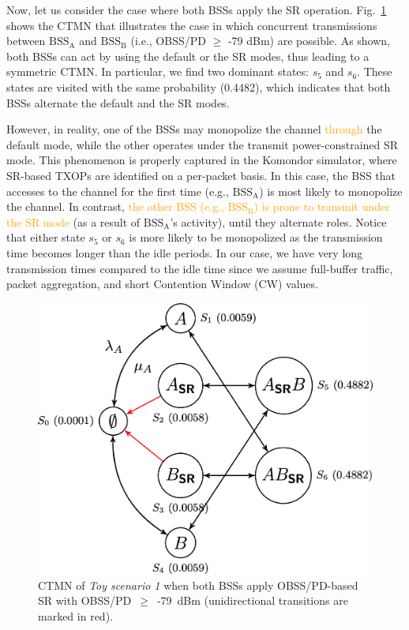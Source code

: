 \documentclass{ieeeaccess}
\begin{document}
Now, let us consider the case where both BSSs apply the SR operation. Fig.~\ref{fig:ctmn_toy_scenario_1c} shows the CTMN that illustrates the case in which concurrent transmissions between $\text{BSS}_\text{A}$ and $\text{BSS}_\text{B}$ (i.e., OBSS/PD $\geq$ -79 dBm) are possible. As shown, both BSSs can act by using the default or the SR modes, thus leading to a symmetric CTMN. In particular, we find two dominant states: $s_5$  and $s_6$. These states are visited with the same probability (0.4482), which indicates that both BSSs alternate the default and the SR modes. 

However, in reality, one of the BSSs may monopolize the channel \textcolor{orange}{through} the default mode, while the other operates under the transmit power-constrained SR mode. This phenomenon is properly captured in the Komondor simulator, where SR-based TXOPs are identified on a per-packet basis. In this case, the BSS that accesses to the channel for the first time (e.g., $\text{BSS}_\text{A}$) is most likely to monopolize the channel. In contrast, \textcolor{orange}{the other BSS (e.g., $\text{BSS}_\text{B}$) is prone to transmit under the SR mode} (as a result of $\text{BSS}_\text{A}$'s activity), until they alternate roles. Notice that either state $s_5$  or $s_6$ is more likely to be monopolized as the transmission time becomes longer than the idle periods. In our case, we have very long transmission times compared to the idle time since we assume full-buffer traffic, packet aggregation, and short Contention Window (CW) values.

\begin{figure}[ht!]
	\centering    
	\includegraphics[width=.9\columnwidth]{ctmn_toy_scenario_1c}
	\caption{CTMN of \emph{Toy scenario 1} when both BSSs apply OBSS/PD-based SR with OBSS/PD~$\geq$~-79~dBm (unidirectional transitions are marked in red).}
	\label{fig:ctmn_toy_scenario_1c}
\end{figure}
\end{document}
